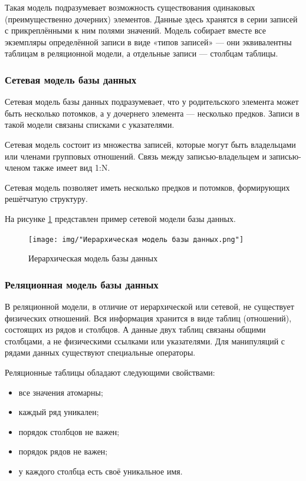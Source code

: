 Такая модель подразумевает возможность существования одинаковых (преимущественно дочерних) элементов. Данные здесь хранятся в серии записей с прикреплёнными к ним полями значений. Модель собирает вместе все экземпляры определённой записи в виде «типов записей» — они эквивалентны таблицам в реляционной модели, а отдельные записи — столбцам таблицы.

\subsubsection{Сетевая модель базы данных}
Сетевая модель базы данных подразумевает, что у родительского элемента может быть несколько потомков, а у дочернего элемента — несколько предков. Записи в такой модели связаны списками с указателями. 

Сетевая модель состоит из множества записей, которые могут быть владельцами или членами групповых отношений. Связь между записью-владельцем и записью-членом также имеет вид 1:N.

Сетевая модель позволяет иметь несколько предков и потомков, формирующих решётчатую структуру.

На рисунке \ref{img:set} представлен пример сетевой модели базы данных.

\begin{figure}[h!]
	\centering
	\texttt{[image: img/"Иерархическая модель базы данных.png"]}
	\caption{Иерархическая модель базы данных}
	\label{img:set}
\end{figure}

\subsubsection{Реляционная модель базы данных}
В реляционной модели, в отличие от иерархической или сетевой, не существует физических отношений. Вся информация хранится в виде таблиц (отношений), состоящих из рядов и столбцов. А данные двух таблиц связаны общими столбцами, а не физическими ссылками или указателями. Для манипуляций с рядами данных существуют специальные операторы.

Реляционные таблицы обладают следующими свойствами:
\begin{itemize}
	\item[1)] все значения атомарны;
	\item[2)] каждый ряд уникален;
	\item[3)] порядок столбцов не важен;
	\item[4)] порядок рядов не важен;
	\item[5)] у каждого столбца есть своё уникальное имя.
\end{itemize}

